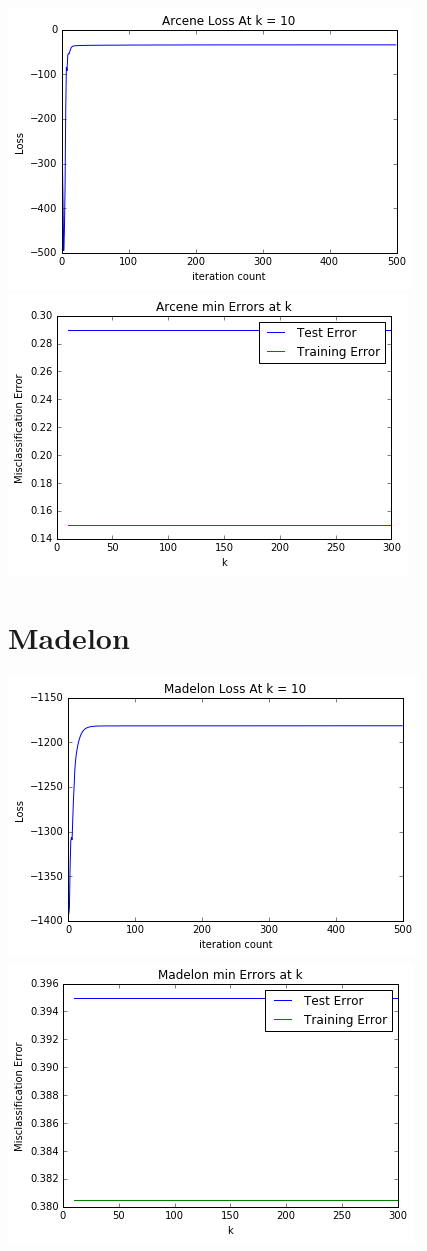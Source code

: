 \documentclass[letter]{article} %
\begin{document}
\includegraphics[scale=1]{arc_loss} \\
\includegraphics[scale=1]{arc_error}

\section*{Madelon}

\includegraphics[scale=1]{mad_loss} \\
\includegraphics[scale=1]{mad_error}
\end{document}
